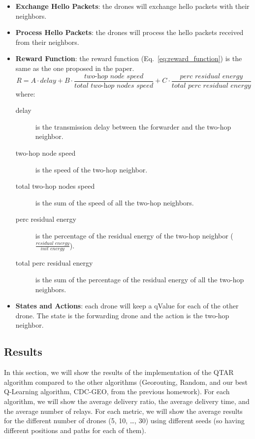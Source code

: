 \begin{itemize}
    \item \textbf{Exchange Hello Packets}: the drones will exchange hello packets with their neighbors.
    \item \textbf{Process Hello Packets}: the drones will process the hello packets received from their neighbors.
    \item \textbf{Reward Function}: the reward function (Eq.~\ref{eq:reward_function}) is the same as the one proposed in the paper.
          \begin{equation}
              \label{eq:reward_function}
              R = A \cdot {\textit{delay}} + B \cdot \frac{\textit{two-hop node speed}}{\textit{total two-hop nodes speed}} + C \cdot \frac{\textit{perc residual energy}}{\textit{total perc residual energy}}
          \end{equation}
          where:
          \begin{description}
              \item[delay] is the transmission delay between the forwarder and the two-hop neighbor.
              \item[two-hop node speed] is the speed of the two-hop neighbor.
              \item[total two-hop nodes speed] is the sum of the speed of all the two-hop neighbors.
              \item[perc residual energy] is the percentage of the residual energy of the two-hop neighbor ($\frac{\textit{residual energy}}{\textit{init energy}}$).
              \item[total perc residual energy] is the sum of the percentage of the residual energy of all the two-hop neighbors.
          \end{description}
    \item \textbf{States and Actions}: each drone will keep a qValue for each of the other drone. The state is the forwarding drone and the action is the two-hop neighbor.
\end{itemize}

\newpage

\subsection{Results}
In this section, we will show the results of the implementation of the QTAR algorithm compared to the other algorithms (Georouting, Random, and our best Q-Learning algorithm, CDC-GEO, from the previous homework).
For each algorithm, we will show the average delivery ratio, the average delivery time, and the average number of relays.
For each metric, we will show the average results for the different number of drones (5, 10, \ldots, 30) using different seeds (so having different positions and paths for each of them).

